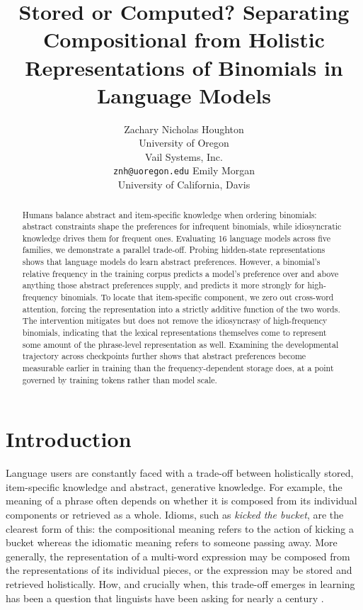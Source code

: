 \documentclass[11pt]{article}
\date{}
\title{Stored or Computed? Separating Compositional from Holistic
Representations of Binomials in Language Models}
\author{
  Zachary Nicholas Houghton \\
      University of Oregon \\ Vail Systems, Inc. \\
        \texttt{znh@uoregon.edu}
     \And
  Emily Morgan \\
      University of California, Davis \\
      }
\begin{document}
\maketitle

\begin{abstract}
Humans balance abstract and item-specific knowledge when ordering
binomials: abstract constraints shape the preferences for infrequent
binomials, while idiosyncratic knowledge drives them for frequent ones.
Evaluating 16 language models across five families, we demonstrate a
parallel trade-off. Probing hidden-state representations shows that
language models do learn abstract preferences. However, a binomial's
relative frequency in the training corpus predicts a model's preference
over and above anything those abstract preferences supply, and predicts
it more strongly for high-frequency binomials. To locate that
item-specific component, we zero out cross-word attention, forcing the
representation into a strictly additive function of the two words. The
intervention mitigates but does not remove the idiosyncrasy of
high-frequency binomials, indicating that the lexical representations
themselves come to represent some amount of the phrase-level
representation as well. Examining the developmental trajectory across
checkpoints further shows that abstract preferences become measurable
earlier in training than the frequency-dependent storage does, at a
point governed by training tokens rather than model scale.
\end{abstract}

\section{Introduction}\label{introduction}

Language users are constantly faced with a trade-off between
holistically stored, item-specific knowledge and abstract, generative
knowledge. For example, the meaning of a phrase often depends on whether
it is composed from its individual components or retrieved as a whole.
Idioms, such as \emph{kicked the bucket}, are the clearest form of this:
the compositional meaning refers to the action of kicking a bucket
whereas the idiomatic meaning refers to someone passing away. More
generally, the representation of a multi-word expression may be composed
from the representations of its individual pieces, or the expression may
be stored and retrieved holistically. How, and crucially when, this
trade-off emerges in learning has been a question that linguists have
been asking for nearly a century
\citep{morgan2015, morgan2024productiveknowledgeitemspecific, houghton2023doespredictabilitydrive, houghton2024frequencydependentpreferenceextremity, houghton2025boltsnutslanguage, houghton2026exemplarsdisguisepure}.
\end{document}
